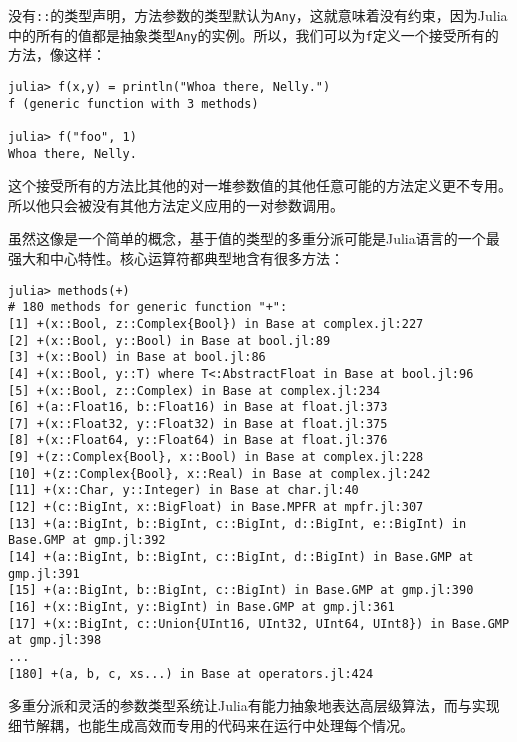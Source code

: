 没有\texttt{::}的类型声明，方法参数的类型默认为\texttt{Any}，这就意味着没有约束，因为Julia中的所有的值都是抽象类型\texttt{Any}的实例。所以，我们可以为\texttt{f}定义一个接受所有的方法，像这样：




\begin{verbatim}
julia> f(x,y) = println("Whoa there, Nelly.")
f (generic function with 3 methods)

julia> f("foo", 1)
Whoa there, Nelly.
\end{verbatim}



这个接受所有的方法比其他的对一堆参数值的其他任意可能的方法定义更不专用。所以他只会被没有其他方法定义应用的一对参数调用。



虽然这像是一个简单的概念，基于值的类型的多重分派可能是Julia语言的一个最强大和中心特性。核心运算符都典型地含有很多方法：




\begin{verbatim}
julia> methods(+)
# 180 methods for generic function "+":
[1] +(x::Bool, z::Complex{Bool}) in Base at complex.jl:227
[2] +(x::Bool, y::Bool) in Base at bool.jl:89
[3] +(x::Bool) in Base at bool.jl:86
[4] +(x::Bool, y::T) where T<:AbstractFloat in Base at bool.jl:96
[5] +(x::Bool, z::Complex) in Base at complex.jl:234
[6] +(a::Float16, b::Float16) in Base at float.jl:373
[7] +(x::Float32, y::Float32) in Base at float.jl:375
[8] +(x::Float64, y::Float64) in Base at float.jl:376
[9] +(z::Complex{Bool}, x::Bool) in Base at complex.jl:228
[10] +(z::Complex{Bool}, x::Real) in Base at complex.jl:242
[11] +(x::Char, y::Integer) in Base at char.jl:40
[12] +(c::BigInt, x::BigFloat) in Base.MPFR at mpfr.jl:307
[13] +(a::BigInt, b::BigInt, c::BigInt, d::BigInt, e::BigInt) in Base.GMP at gmp.jl:392
[14] +(a::BigInt, b::BigInt, c::BigInt, d::BigInt) in Base.GMP at gmp.jl:391
[15] +(a::BigInt, b::BigInt, c::BigInt) in Base.GMP at gmp.jl:390
[16] +(x::BigInt, y::BigInt) in Base.GMP at gmp.jl:361
[17] +(x::BigInt, c::Union{UInt16, UInt32, UInt64, UInt8}) in Base.GMP at gmp.jl:398
...
[180] +(a, b, c, xs...) in Base at operators.jl:424
\end{verbatim}



多重分派和灵活的参数类型系统让Julia有能力抽象地表达高层级算法，而与实现细节解耦，也能生成高效而专用的代码来在运行中处理每个情况。



\hypertarget{8405464025999625028}{}


